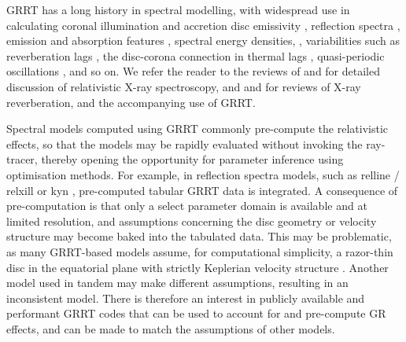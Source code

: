 \documentclass[fleqn,usenatbib]{mnras}
\newcommand{\software}[1]{{\sc #1}}
\begin{document}
GRRT has a long history in spectral modelling, with widespread use in
calculating coronal illumination and accretion disc emissivity
\citep[e.g.][]{wilkins_understanding_2012, wilkins_towards_2016}, reflection
spectra \citep{fabian_x-ray_1989}, emission and absorption features
\citep[e.g.][]{ruszkowski_absorption_2002}, spectral energy densities,
\citep[e.g.][]{hagen_estimating_2023}, variabilities such as reverberation lags
\citep[e.g.][]{ingram_public_2019}, the disc-corona
connection in thermal lags \citep[e.g.][]{kammoun_hard_2019}, quasi-periodic
oscillations \citep[QPOs, e.g.][]{tsang_iron_2013}, and so on. We refer the
reader to the reviews of \citet{reynolds_iron_lines_2003} and
\citet{reynolds_observational_2021} for detailed discussion of relativistic
X-ray spectroscopy, and \citet{uttley_x-ray_2014} and
\citet{cackett_reverberation_2021} for reviews of X-ray reverberation, and the
accompanying use of GRRT.

Spectral models computed using GRRT commonly pre-compute the relativistic
effects, so that the models may be rapidly evaluated without invoking the
ray-tracer, thereby opening the opportunity for parameter inference using
optimisation methods. For example, in reflection spectra models, such as
\software{relline} / \software{relxill} \citep{dauser_broad_2010,
dauser_relativistic_2016} or \software{kyn} \citep{dovciak_extended_2004},
pre-computed tabular GRRT data is integrated. A consequence of pre-computation
is that only a select parameter domain is available and at limited resolution,
and assumptions concerning the disc geometry or velocity structure may become
baked into the tabulated data.  This may be problematic, as many GRRT-based
models assume, for computational simplicity, a razor-thin disc in the equatorial
plane with strictly Keplerian velocity structure
\citep[e.g.][]{laor_line_1991,dovciak_extended_2004, beckwith_iron_2004,
brenneman_constraining_2006, dauser_broad_2010}. Another model used in tandem
may make different assumptions, resulting in an inconsistent model. There is
therefore an interest in publicly available and performant GRRT codes that can
be used to account for and pre-compute GR effects, and can be made to
match the assumptions of other models.
\end{document}
